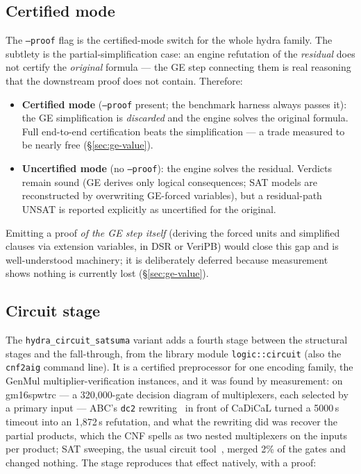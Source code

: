 \documentclass[10pt]{article}
\begin{document}
\subsection{Certified mode}
\label{sec:certified}

The \texttt{--proof} flag is the certified-mode switch for the whole
hydra family. The subtlety is the partial-simplification case: an
engine refutation of the \emph{residual} does not certify the
\emph{original} formula --- the GE step connecting them is real
reasoning that the downstream proof does not contain. Therefore:

\begin{itemize}
\item \textbf{Certified mode} (\texttt{--proof} present; the benchmark
  harness always passes it): the GE simplification is
  \emph{discarded} and the engine solves the original formula. Full
  end-to-end certification beats the simplification --- a trade
  measured to be nearly free (\S\ref{sec:ge-value}).
\item \textbf{Uncertified mode} (no \texttt{--proof}): the engine
  solves the residual. Verdicts remain sound (GE derives only logical
  consequences; SAT models are reconstructed by overwriting GE-forced
  variables), but a residual-path UNSAT is reported explicitly as
  uncertified for the original.
\end{itemize}

Emitting a proof \emph{of the GE step itself} (deriving the forced
units and simplified clauses via extension variables, in DSR or
VeriPB) would close this gap and is well-understood machinery; it is
deliberately deferred because measurement shows nothing is currently
lost (\S\ref{sec:ge-value}).

\subsection{Circuit stage}
\label{sec:circuit}

The \texttt{hydra\_circuit\_satsuma} variant adds a fourth stage
between the structural stages and the fall-through, from the library
module \texttt{logic::circuit} (also the \texttt{cnf2aig} command
line). It is a certified preprocessor for one encoding family, the
GenMul multiplier-verification instances, and it was found by
measurement: on gm16spwtrc --- a 320{,}000-gate decision diagram of
multiplexers, each selected by a primary input --- ABC's \texttt{dc2}
rewriting~\cite{abc,dagaware} in front of CaDiCaL turned a 5000\,s
timeout into an 1{,}872\,s refutation, and what the rewriting did was
recover the partial products, which the CNF spells as two nested
multiplexers on the inputs per product; SAT sweeping, the usual circuit
tool~\cite{kuehlmann02,fraig}, merged 2\% of the gates and changed
nothing. The stage reproduces that effect
natively, with a proof:
\end{document}
